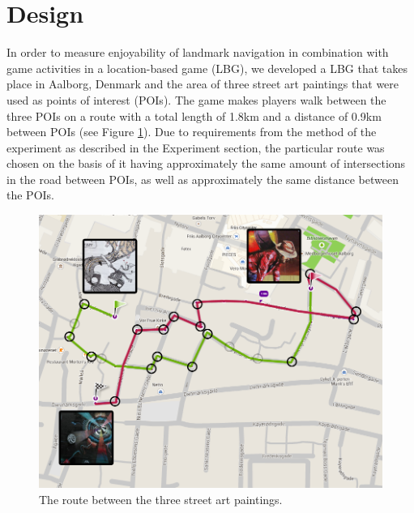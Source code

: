 \section{Design}
In order to measure enjoyability of landmark navigation in combination with game activities in a location-based game (LBG), we developed a LBG that takes place in Aalborg, Denmark and the area of three street art paintings \cite{streetart} that were used as points of interest (POIs). The game makes players walk between the three POIs on a route with a total length of 1.8km and a distance of 0.9km between POIs (see Figure \ref{FinalRoute}). Due to requirements from the method of the experiment as described in the Experiment section, the particular route was chosen on the basis of it having approximately the same amount of intersections in the road between POIs, as well as approximately the same distance between the POIs.

\begin{figure}[hbtp]
\centering
\includegraphics[scale=0.2]{Pics/FinalRoute.png}
\caption{The route between the three street art paintings.}
\label{FinalRoute}
\end{figure}


